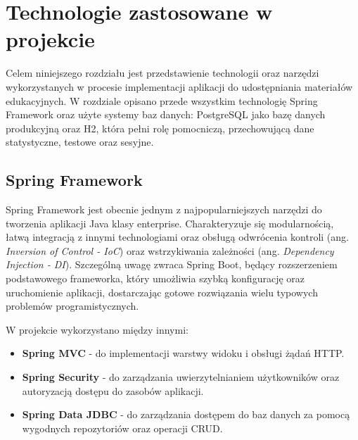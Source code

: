 %


\chapter{Technologie zastosowane w projekcie}
\label{rozdzial1}

Celem niniejszego rozdziału jest przedstawienie technologii oraz narzędzi wykorzystanych w procesie implementacji aplikacji do udostępniania materiałów edukacyjnych. W rozdziale opisano przede wszystkim technologię Spring Framework oraz użyte systemy baz danych: PostgreSQL jako bazę danych produkcyjną oraz H2, która pełni rolę pomocniczą, przechowującą dane statystyczne, testowe oraz sesyjne.

\section{Spring Framework}

Spring Framework jest obecnie jednym z najpopularniejszych narzędzi do tworzenia aplikacji Java klasy enterprise. Charakteryzuje się modularnością, łatwą integracją z innymi technologiami oraz obsługą odwrócenia kontroli (ang. \textit{Inversion of Control - IoC}) oraz wstrzykiwania zależności (ang. \textit{Dependency Injection - DI}). Szczególną uwagę zwraca Spring Boot, będący rozszerzeniem podstawowego frameworka, który umożliwia szybką konfigurację oraz uruchomienie aplikacji, dostarczając gotowe rozwiązania wielu typowych problemów programistycznych.

W projekcie wykorzystano między innymi:
\begin{itemize}
    \item \textbf{Spring MVC} - do implementacji warstwy widoku i obsługi żądań HTTP.
    \item \textbf{Spring Security} - do zarządzania uwierzytelnianiem użytkowników oraz autoryzacją dostępu do zasobów aplikacji.
    \item \textbf{Spring Data JDBC} - do zarządzania dostępem do baz danych za pomocą wygodnych repozytoriów oraz operacji CRUD.
\end{itemize}

